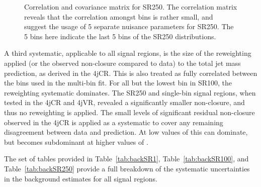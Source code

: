 
\begin{figure}[!ht]
  \centering
  
    
  \caption{Correlation and covariance matrix for SR250. The correlation matrix reveals that the correlation amongst bins is rather small, and suggest the usage of 5 separate nuisance parameters for SR250. The 5 bins here indicate the last 5 bins of the SR250 distributions.}
           
  \label{fig:search:search:systematics:SR250}
\end{figure}

A third systematic, applicable to all signal regions, is the size of the reweighting applied (or the observed non-closure compared to data) to the total jet mass prediction, as derived in the 4jCR. This is also treated as fully correlated between the bins used in the multi-bin fit.  For all but the lowest \MJ bin in SR100, the reweighting systematic dominates. The SR250 and single-bin signal regions, when tested in the 4jCR and 4jVR, revealed a significantly smaller non-closure, and thus no reweighting is applied. The small levels of significant residual non-closure observed in the 4jCR is applied as a systematic to cover any remaining disagreement between data and prediction. At low values of \MJ this can dominate, but becomes subdominant at higher values of \MJ.

The set of tables provided in Table~\ref{tab:backSR1}, Table~\ref{tab:backSR100}, and Table~\ref{tab:backSR250} provide a full breakdown of the systematic uncertainties in the background estimates for all signal regions.

